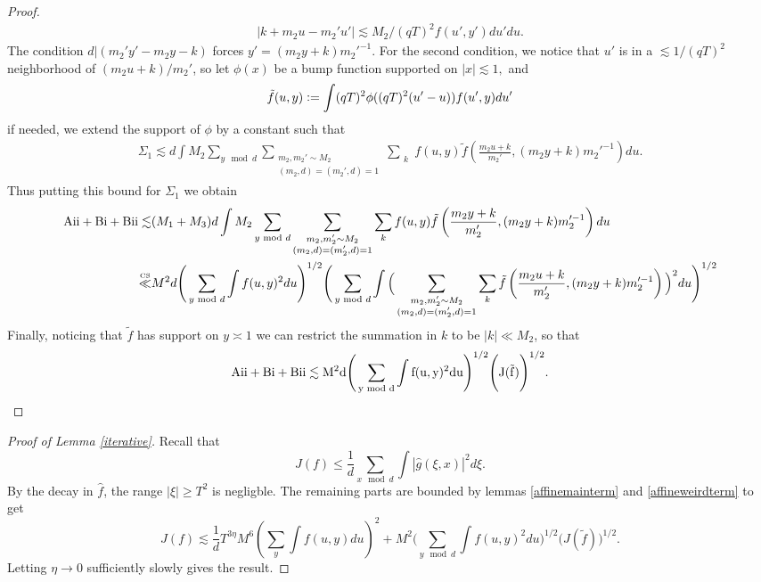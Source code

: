 \begin{proof}
\begin{align*}
{{        |k+m_2u-m_2'u'|\lesssim M_2/(qT)^2}} f(u',y')  du' du.
     \end{align*}
    The condition $d|(m_2'y'-m_2y-k)$ forces $y'= (m_2y+k)m_2'^{-1}$.
    For the second condition, we notice that $u'$ is in a $\lesssim 1/(qT)^2$ neighborhood of $(m_2u+k)/m_2'$, so let $\phi(x)$ be a bump function supported on $|x|\lesssim 1,$ and  \[
    \tilde{f}(u,y) \defeq \int (qT)^2 \phi((qT)^2(u'-u)) f(u',y) du'
    \]
    if needed, we extend the support of $\phi$ by a constant such that 
    \begin{align*}
        \Sigma_1\lesssim
        d \int  {M_2} \sum_{y\mod d}\sum_{\substack{m_2,m_2'\sim M_2\\(m_2,d)=(m_2',d)=1
        }} \sum_{\substack{k}}  f(u,y) \tilde{f}\left(\frac{m_2u+k}{m_2'},(m_2y+k)m_2'^{-1}\right)  du.
     \end{align*}
     Thus putting this bound for $\Sigma_1$ we obtain
     \begin{align*}
        \rm{Aii}+{Bi}+{Bii}\lesssim& (M_1+M_3) d \int  {M_2} \sum_{y\mod d}\sum_{\substack{m_2,m_2'\sim M_2\\(m_2,d)=(m_2',d)=1
        }} \sum_{\substack{k}}  f(u,y) \tilde{f}\left(\frac{m_2y+k}{m_2'},(m_2y+k)m_2'^{-1}\right)  du\\
        \stackon{CS}{\ll}& M^2d \Bigg(\sum_{y\mod d}\int f(u,y)^2 du \Bigg) ^{1/2}
        \Bigg(\sum_{y\mod d} \int \Big(\sum_{\substack{m_2,m_2'\sim M_2\\(m_2,d)=(m_2',d)=1
        }} \sum_{\substack{k}} \tilde{f}\left(\frac{m_2u+k}{m_2'},(m_2y+k)m_2'^{-1}\right)\Big)^2 du\Bigg) ^{1/2}
    \end{align*}
    Finally, noticing that $\tilde{f}$ has support on $y\asymp 1$ we can restrict the summation in $k$ to be $|k|\ll M_2$, so that 
    \begin{align*}
        \rm{Aii}+{Bi}+{Bii}\lesssim M^2d \Bigg(\sum_{y\mod d}\int f(u,y)^2 du \Bigg) ^{1/2}
        \Bigg(J(\tilde{f})\Bigg) ^{1/2}.
    \end{align*}
\end{proof}
\begin{proof}[Proof of Lemma \ref{iterative}]
    Recall that\[
J(f)\leq \frac{1}{d}\sum_{x\mod d} \int |\hat{g}(\xi,x)|^2 d\xi.
\]
By the decay in $\hat{f}$, the range $|\xi|\geq T^2$ is negligble. The remaining parts are bounded by lemmas \ref{affinemainterm} and \ref{affineweirdterm} to get \[
J(f)\lesssim \frac{1}{d}T^{3\eta}M^6\left(\sum_y \int f(u,y) du\right)^2+ M^2 \Bigg(\sum_{y\mod d}\int f(u,y)^2 du \Bigg) ^{1/2}
\Bigg(J(\tilde{f})\Bigg) ^{1/2}.
\]
Letting $\eta \to 0$ sufficiently slowly gives the result.
\end{proof}


